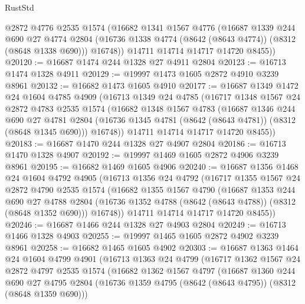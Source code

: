 \begin{lexlean}{RustStd}
\begin{coremodule}
        @2872
        @4776
        @2535
        @1574
        (@16682
          @1341
          @1567
          @4776
          (@16687
            @1339
            @244
            @690
            @27
            @4774
            @2804
            (@16736 @1338 @4774 (@8642 (@8643 @4774)) (@8312 (@8648 @1338 @690)))
            @16748))
        @14711
        @14714
        @14717
        @14720
        @8455))
@20120 := @16687 @1474 @244 @1328 @27 @4911 @2804
@20123 := @16713 @1474 @1328 @4911
@20129 := @19997 @1473 @1605 @2872 @4910 @3239 @8961
@20132 := @16682 @1473 @1605 @4910
@20177 := @16687
    @1349
    @1472
    @24
    @1604
    @4785
    @4909
    (@16713
      @1349
      @24
      @4785
      (@16717
        @1348
        @1567
        @24
        @2872
        @4783
        @2535
        @1574
        (@16682
          @1348
          @1567
          @4783
          (@16687
            @1346
            @244
            @690
            @27
            @4781
            @2804
            (@16736 @1345 @4781 (@8642 (@8643 @4781)) (@8312 (@8648 @1345 @690)))
            @16748))
        @14711
        @14714
        @14717
        @14720
        @8455))
@20183 := @16687 @1470 @244 @1328 @27 @4907 @2804
@20186 := @16713 @1470 @1328 @4907
@20192 := @19997 @1469 @1605 @2872 @4906 @3239 @8961
@20195 := @16682 @1469 @1605 @4906
@20240 := @16687
    @1356
    @1468
    @24
    @1604
    @4792
    @4905
    (@16713
      @1356
      @24
      @4792
      (@16717
        @1355
        @1567
        @24
        @2872
        @4790
        @2535
        @1574
        (@16682
          @1355
          @1567
          @4790
          (@16687
            @1353
            @244
            @690
            @27
            @4788
            @2804
            (@16736 @1352 @4788 (@8642 (@8643 @4788)) (@8312 (@8648 @1352 @690)))
            @16748))
        @14711
        @14714
        @14717
        @14720
        @8455))
@20246 := @16687 @1466 @244 @1328 @27 @4903 @2804
@20249 := @16713 @1466 @1328 @4903
@20255 := @19997 @1465 @1605 @2872 @4902 @3239 @8961
@20258 := @16682 @1465 @1605 @4902
@20303 := @16687
    @1363
    @1464
    @24
    @1604
    @4799
    @4901
    (@16713
      @1363
      @24
      @4799
      (@16717
        @1362
        @1567
        @24
        @2872
        @4797
        @2535
        @1574
        (@16682
          @1362
          @1567
          @4797
          (@16687
            @1360
            @244
            @690
            @27
            @4795
            @2804
            (@16736 @1359 @4795 (@8642 (@8643 @4795)) (@8312 (@8648 @1359 @690)))

\end{coremodule}
\end{lexlean}
